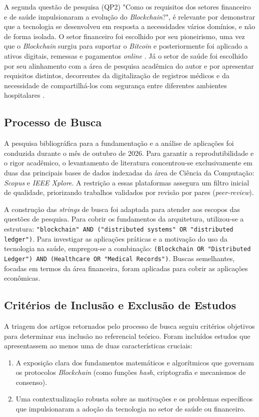 A segunda questão de pesquisa (QP2) "Como os requisitos dos setores financeiro e de saúde impulsionaram a evolução do \textit{Blockchain}?", é relevante por demonstrar que a tecnologia se desenvolveu em resposta a necessidades vários domínios, e não de forma isolada. O setor financeiro foi escolhido por seu pioneirismo, uma vez que o \textit{Blockchain} surgiu para suportar o \textit{Bitcoin} e posteriormente foi aplicado a ativos digitais, remessas e pagamentos \textit{online} \cite{trendsCrypto}. Já o setor de saúde foi escolhido por seu alinhamento com a área de pesquisa acadêmica do autor e por apresentar requisitos distintos, decorrentes da digitalização de registros médicos e da necessidade de compartilhá-los com segurança entre diferentes ambientes hospitalares \cite{blockSurvey1,blockMed1}.

\subsection{Processo de Busca}
\label{subsec:pb}

A pesquisa bibliográfica para a fundamentação e a análise de aplicações foi conduzida durante o mês de outubro de 2026. Para garantir a reprodutibilidade e o rigor acadêmico, o levantamento de literatura concentrou-se exclusivamente em duas das principais bases de dados indexadas da área de Ciência da Computação: \textit{Scopus} e \textit{IEEE Xplore}. A restrição a essas plataformas assegura um filtro inicial de qualidade, priorizando trabalhos validados por revisão por pares (\textit{peer-review}).

A construção das \textit{strings} de busca foi adaptada para atender aos escopos das questões de pesquisa. Para cobrir os fundamentos da arquitetura, utilizou-se a estrutura: \texttt{"blockchain" AND ("distributed systems" OR "distributed ledger")}. Para investigar as aplicações práticas e a motivação do uso da tecnologia na saúde, empregou-se a combinação: \texttt{(Blockchain OR "Distributed Ledger") AND (Healthcare OR "Medical Records")}. Buscas semelhantes, focadas em termos da área financeira, foram aplicadas para cobrir as aplicações econômicas.

\subsection{Critérios de Inclusão e Exclusão de Estudos}
\label{subsec:criterios}

A triagem dos artigos retornados pelo processo de busca seguiu critérios objetivos para determinar sua inclusão no referencial teórico. Foram incluídos estudos que apresentassem ao menos uma de duas características cruciais: 
\begin{enumerate}
    \item A exposição clara dos fundamentos matemáticos e algorítmicos que governam os protocolos \textit{Blockchain} (como funções \textit{hash}, criptografia e mecanismos de consenso).
    \item Uma contextualização robusta sobre as motivações e os problemas específicos que impulsionaram a adoção da tecnologia no setor de saúde ou financeiro.
\end{enumerate}

